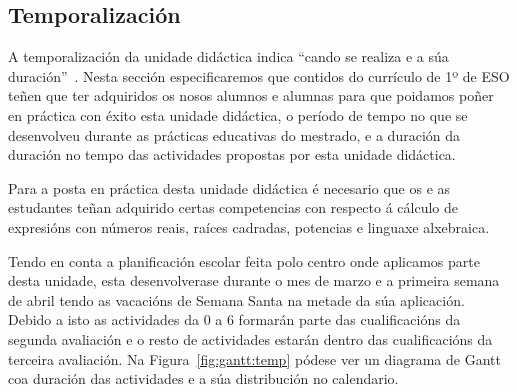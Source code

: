 \subsection{Temporalización}
A temporalización da unidade didáctica indica ``cando se realiza e a súa duración''~\cite{delvalleud}. Nesta sección especificaremos que contidos do currículo de 1º de ESO teñen que ter adquiridos os nosos alumnos e alumnas para que poidamos poñer en práctica con éxito esta unidade didáctica, o período de tempo no que se desenvolveu durante as prácticas educativas do mestrado, e a duración da duración no tempo das actividades propostas por esta unidade didáctica.

Para a posta en práctica desta unidade didáctica é necesario que os e as estudantes teñan adquirido certas competencias con respecto á cálculo de expresións con números reais, raíces cadradas, potencias e linguaxe alxebraica.

Tendo en conta a planificación escolar feita polo centro onde aplicamos parte desta unidade, esta desenvolverase durante o mes de marzo e a primeira semana de abril tendo as vacacións de Semana Santa na metade da súa aplicación. Debido a isto as actividades da 0 a 6 formarán parte das cualificacións da segunda avaliación e o resto de actividades estarán dentro das cualificacións da terceira avaliación. Na Figura~\ref{fig:gantt:temp} pódese ver un diagrama de Gantt coa duración das actividades e a súa distribución no calendario.

